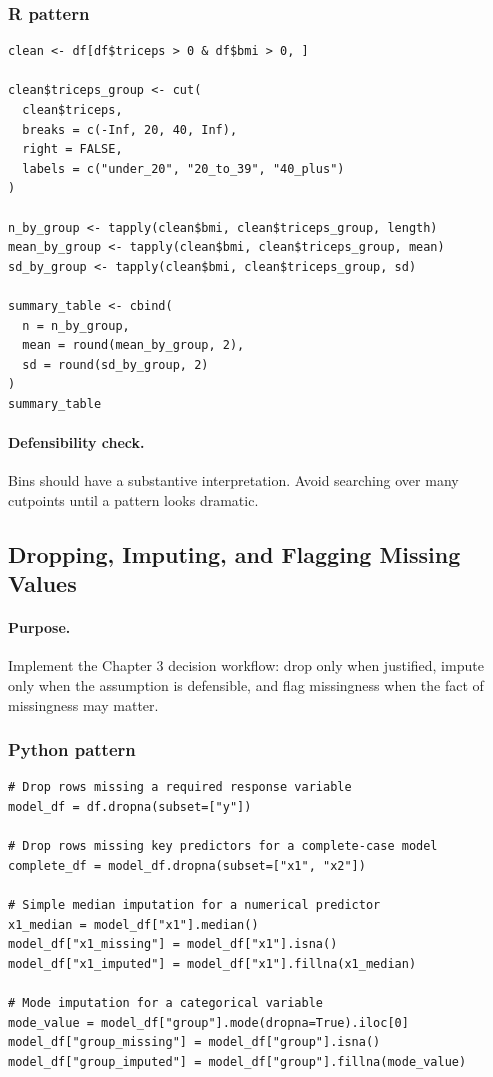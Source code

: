 \subsubsection*{R pattern}

\begin{verbatim}
clean <- df[df$triceps > 0 & df$bmi > 0, ]

clean$triceps_group <- cut(
  clean$triceps,
  breaks = c(-Inf, 20, 40, Inf),
  right = FALSE,
  labels = c("under_20", "20_to_39", "40_plus")
)

n_by_group <- tapply(clean$bmi, clean$triceps_group, length)
mean_by_group <- tapply(clean$bmi, clean$triceps_group, mean)
sd_by_group <- tapply(clean$bmi, clean$triceps_group, sd)

summary_table <- cbind(
  n = n_by_group,
  mean = round(mean_by_group, 2),
  sd = round(sd_by_group, 2)
)
summary_table
\end{verbatim}

\paragraph{Defensibility check.} Bins should have a substantive interpretation.  Avoid searching over many cutpoints until a pattern looks dramatic.

\subsection{Dropping, Imputing, and Flagging Missing Values}
\label{app:ch03-software-cookbook-missing-decisions}

\paragraph{Purpose.} Implement the Chapter 3 decision workflow: drop only when justified, impute only when the assumption is defensible, and flag missingness when the fact of missingness may matter.

\subsubsection*{Python pattern}

\begin{verbatim}
# Drop rows missing a required response variable
model_df = df.dropna(subset=["y"])

# Drop rows missing key predictors for a complete-case model
complete_df = model_df.dropna(subset=["x1", "x2"])

# Simple median imputation for a numerical predictor
x1_median = model_df["x1"].median()
model_df["x1_missing"] = model_df["x1"].isna()
model_df["x1_imputed"] = model_df["x1"].fillna(x1_median)

# Mode imputation for a categorical variable
mode_value = model_df["group"].mode(dropna=True).iloc[0]
model_df["group_missing"] = model_df["group"].isna()
model_df["group_imputed"] = model_df["group"].fillna(mode_value)
\end{verbatim}

